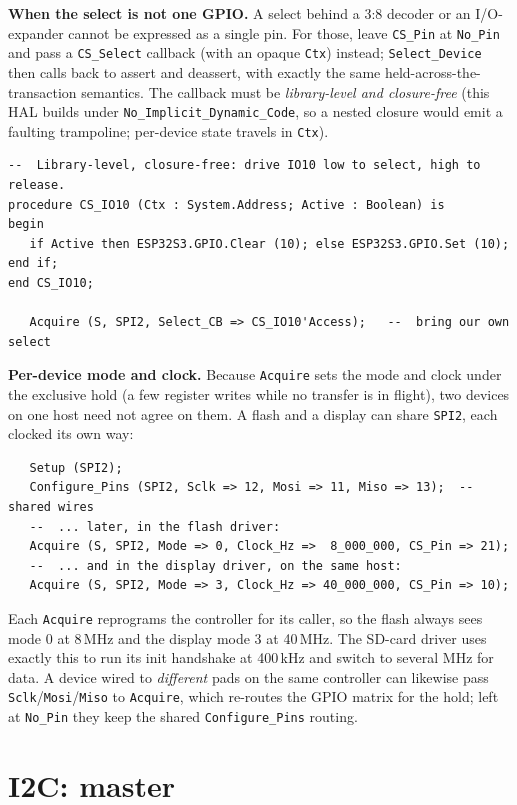 \textbf{When the select is not one GPIO.} A select behind a 3:8 decoder or an
I/O-expander cannot be expressed as a single pin. For those, leave
\texttt{CS\_Pin} at \texttt{No\_Pin} and pass a \texttt{CS\_Select} callback (with
an opaque \texttt{Ctx}) instead; \texttt{Select\_Device} then calls back to assert
and deassert, with exactly the same held-across-the-transaction semantics. The
callback must be \emph{library-level and closure-free} (this HAL builds under
\texttt{No\_Implicit\_Dynamic\_Code}, so a nested closure would emit a faulting
trampoline; per-device state travels in \texttt{Ctx}).

\begin{lstlisting}
--  Library-level, closure-free: drive IO10 low to select, high to release.
procedure CS_IO10 (Ctx : System.Address; Active : Boolean) is
begin
   if Active then ESP32S3.GPIO.Clear (10); else ESP32S3.GPIO.Set (10); end if;
end CS_IO10;

   Acquire (S, SPI2, Select_CB => CS_IO10'Access);   --  bring our own select
\end{lstlisting}

\textbf{Per-device mode and clock.} Because
\texttt{Acquire} sets the mode and clock under the exclusive hold (a few register
writes while no transfer is in flight), two devices on one host need not agree on
them. A flash and a display can share \texttt{SPI2}, each clocked its own way:

\begin{lstlisting}
   Setup (SPI2);
   Configure_Pins (SPI2, Sclk => 12, Mosi => 11, Miso => 13);  --  shared wires
   --  ... later, in the flash driver:
   Acquire (S, SPI2, Mode => 0, Clock_Hz =>  8_000_000, CS_Pin => 21);
   --  ... and in the display driver, on the same host:
   Acquire (S, SPI2, Mode => 3, Clock_Hz => 40_000_000, CS_Pin => 10);
\end{lstlisting}

\noindent Each \texttt{Acquire} reprograms the controller for its caller, so the
flash always sees mode 0 at 8\,MHz and the display mode 3 at 40\,MHz. The SD-card
driver uses exactly this to run its init handshake at 400\,kHz and switch to several
MHz for data. A device wired to \emph{different} pads on the same controller can
likewise pass \texttt{Sclk}/\texttt{Mosi}/\texttt{Miso} to \texttt{Acquire}, which
re-routes the GPIO matrix for the hold; left at \texttt{No\_Pin} they keep the shared
\texttt{Configure\_Pins} routing.

\section{I2C: master}

